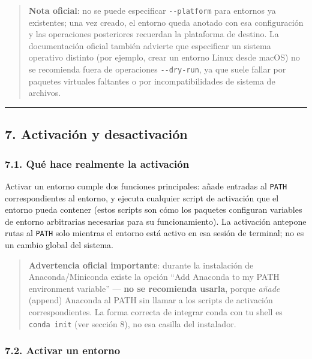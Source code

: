 \documentclass[
  doc,
  floatsintext,
  longtable,
  a4paper,
  nolmodern,
  notxfonts,
  notimes,
  12pt,
  colorlinks=true,linkcolor=blue,citecolor=blue,urlcolor=blue]{apa7}
\begin{document}
\begin{quote}
\textbf{Nota oficial}: no se puede especificar \texttt{-\/-platform}
para entornos ya existentes; una vez creado, el entorno queda anotado
con esa configuración y las operaciones posteriores recuerdan la
plataforma de destino. La documentación oficial también advierte que
especificar un sistema operativo distinto (por ejemplo, crear un entorno
Linux desde macOS) no se recomienda fuera de operaciones
\texttt{-\/-dry-run}, ya que suele fallar por paquetes virtuales
faltantes o por incompatibilidades de sistema de archivos.
\end{quote}

\begin{center}\rule{0.5\linewidth}{0.5pt}\end{center}

\subsection{7. Activación y
desactivación}\label{activaciuxf3n-y-desactivaciuxf3n}

\subsubsection{7.1. Qué hace realmente la
activación}\label{quuxe9-hace-realmente-la-activaciuxf3n}

Activar un entorno cumple dos funciones principales: añade entradas al
\texttt{PATH} correspondientes al entorno, y ejecuta cualquier script de
activación que el entorno pueda contener (estos scripts son cómo los
paquetes configuran variables de entorno arbitrarias necesarias para su
funcionamiento). La activación antepone rutas al \texttt{PATH} solo
mientras el entorno está activo en esa sesión de terminal; no es un
cambio global del sistema.

\begin{quote}
\textbf{Advertencia oficial importante}: durante la instalación de
Anaconda/Miniconda existe la opción ``Add Anaconda to my PATH
environment variable'' --- \textbf{no se recomienda usarla}, porque
\emph{añade} (append) Anaconda al PATH sin llamar a los scripts de
activación correspondientes. La forma correcta de integrar conda con tu
shell es \texttt{conda\ init} (ver sección 8), no esa casilla del
instalador.
\end{quote}

\subsubsection{7.2. Activar un entorno}\label{activar-un-entorno}
\end{document}
